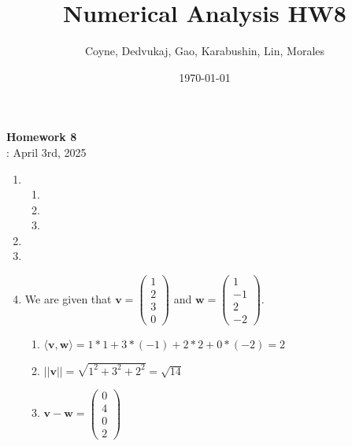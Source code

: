 \documentclass[12pt]{article}
\title{Numerical Analysis HW8}
\author{Coyne, Dedvukaj, Gao, Karabushin, Lin, Morales}
\date{\today}
\begin{document}
\pagestyle{fancy}


\begin{center}
\textbf{\Large Homework 8} \\
: April 3rd, 2025
\end{center}

\begin{enumerate}[leftmargin=0em]
  \item
  \begin{enumerate}[leftmargin=!]
    \item

    \item

    \item
  \end{enumerate}

  \item
  
  \item
  
  \item
  We are given that $\mathbf{v} = \begin{pmatrix}
    1\\
    2\\
    3\\
    0
  \end{pmatrix}$ and
  $\mathbf{w} = \begin{pmatrix}
    1\\
    -1\\
    2\\
    -2
  \end{pmatrix}$.
  \begin{enumerate}[leftmargin=!]
    \item $\langle \mathbf{v} , \mathbf{w} \rangle = 1 * 1 + 3 * (-1) + 2 * 2 + 0 * (-2) = 2$

    \item $||\mathbf{v}|| = \sqrt{1^{2} + 3^{2} + 2^{2}} = \sqrt{14}$

    \item $\mathbf{v} - \mathbf{w} = \begin{pmatrix}
      0 \\
      4 \\
      0 \\
      2
    \end{pmatrix}$


\end{enumerate}
\end{enumerate}
\end{document}

